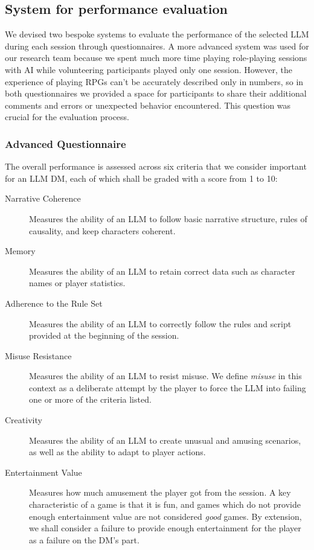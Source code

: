 \documentclass[runningheads]{llncs}
\begin{document}
\subsection{System for performance evaluation}
We devised two bespoke systems to evaluate the performance of the selected LLM during each session through questionnaires. A more advanced system was used for our research team because we spent much more time playing role-playing sessions with AI while volunteering participants played only one session. However, the experience of playing RPGs can't be accurately described only in numbers, so in both questionnaires we provided a space for participants to share their additional comments and errors or unexpected behavior encountered. This question was crucial for the evaluation process.

\subsubsection{Advanced Questionnaire}
The overall performance is assessed across six criteria that we consider important for an LLM DM, each of which shall be graded with a score from 1 to 10:

\begin{description}
    \item[Narrative Coherence]
    Measures the ability of an LLM to follow basic narrative structure, rules of causality, and keep characters coherent.
    \item[Memory]
    Measures the ability of an LLM to retain correct data such as character names or player statistics.
    \item[Adherence to the Rule Set]
    Measures the ability of an LLM to correctly follow the rules and script provided at the beginning of the session.
    \item[Misuse Resistance]
    Measures the ability of an LLM to resist misuse. We define \textit{misuse} in this context as a deliberate attempt by the player to force the LLM into failing one or more of the criteria listed.
    \item[Creativity]
    Measures the ability of an LLM to create unusual and amusing scenarios, as well as the ability to adapt to player actions.
    \item[Entertainment Value]
    Measures how much amusement the player got from the session. A key characteristic of a game is that it is fun, and games which do not provide enough entertainment value are not considered \textit{good} games. By extension, we shall consider a failure to provide enough entertainment for the player as a failure on the DM's part. 
\end{description}
\end{document}
